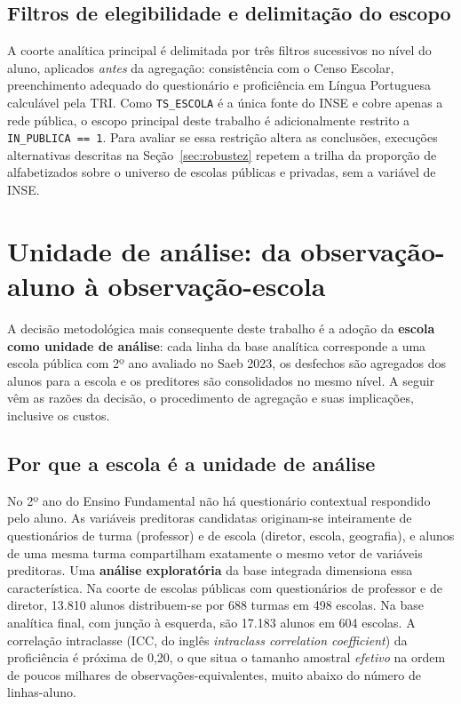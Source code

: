 \subsection{Filtros de elegibilidade e delimitação do escopo}

A coorte analítica principal é delimitada por três filtros sucessivos no
nível do aluno, aplicados \emph{antes} da agregação: consistência com o
Censo Escolar, preenchimento adequado do questionário e proficiência em
Língua Portuguesa calculável pela TRI. Como \texttt{TS\_ESCOLA} é a única
fonte do INSE e cobre apenas a rede pública, o escopo principal deste
trabalho é adicionalmente restrito a \texttt{IN\_PUBLICA~==~1}. Para
avaliar se essa restrição altera as conclusões, execuções alternativas
descritas na Seção~\ref{sec:robustez} repetem a trilha da proporção de
alfabetizados sobre o universo de escolas públicas e privadas, sem a
variável de INSE.

\section{Unidade de análise: da observação-aluno à observação-escola}
\label{sec:unidade-escola}

A decisão metodológica mais consequente deste trabalho é a adoção da
\textbf{escola como unidade de análise}: cada linha da base analítica
corresponde a uma escola pública com 2º ano avaliado no Saeb 2023, os
desfechos são agregados dos alunos para a escola e os preditores são
consolidados no mesmo nível. A seguir vêm as razões da decisão, o
procedimento de agregação e suas implicações, inclusive os custos.

\subsection{Por que a escola é a unidade de análise}
\label{sec:limitacao-estrutural}

No 2º ano do Ensino Fundamental não há questionário contextual respondido
pelo aluno. As variáveis preditoras candidatas originam-se inteiramente de
questionários de turma (professor) e de escola (diretor, escola,
geografia), e alunos de uma mesma turma compartilham exatamente o mesmo
vetor de variáveis preditoras. Uma \textbf{análise exploratória} da base
integrada dimensiona essa característica. Na coorte de escolas públicas
com questionários de professor e de diretor, 13.810 alunos distribuem-se
por 688 turmas em 498 escolas. Na base analítica final, com junção à
esquerda, são 17.183 alunos em 604 escolas. A correlação intraclasse (ICC,
do inglês \textit{intraclass correlation coefficient}) da proficiência é
próxima de 0,20, o que situa o tamanho amostral \emph{efetivo} na ordem de
poucos milhares de observações-equivalentes, muito abaixo do número de
linhas-aluno.

